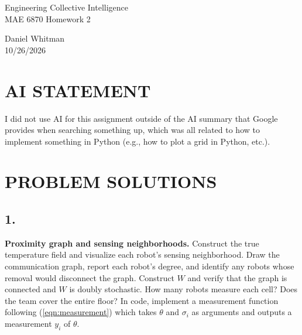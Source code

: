 \documentclass[12pt]{article}
\newcommand{\mainmatter}{\clearpage\setcounter{page}{1}\pagenumbering{arabic}}
\begin{document}
\begin{titlepage}
\begin{center}
    \vspace*{\fill}
    {\Huge Engineering Collective Intelligence}\\
    {\large MAE 6870 Homework 2}

    \vspace{4\baselineskip}
    Daniel Whitman\\
    10/26/2026
\end{center}


\vspace*{\fill}
\end{titlepage}


\mainmatter
\section*{AI STATEMENT}
I did not use AI for this assignment outside of the AI summary that Google provides when searching something up, which was all related to how to implement something in Python (e.g., how to plot a grid in Python, etc.).

\section*{PROBLEM SOLUTIONS}\label{sec:problems}
\subsection*{1.}
\textbf{Proximity graph and sensing neighborhoods.}
Construct the true temperature field and visualize each robot's sensing neighborhood. Draw the communication graph, report each robot's degree, and identify any robots whose removal would disconnect the graph. Construct $W$ and verify that the graph is connected and $W$ is doubly stochastic. How many robots measure each cell? Does the team cover the entire floor? In code, implement a measurement function following (\ref{eqn:measurement}) which takes $\theta$ and $\sigma_i$ as arguments and outputs a measurement $y_i$ of $\theta$.
\end{document}
